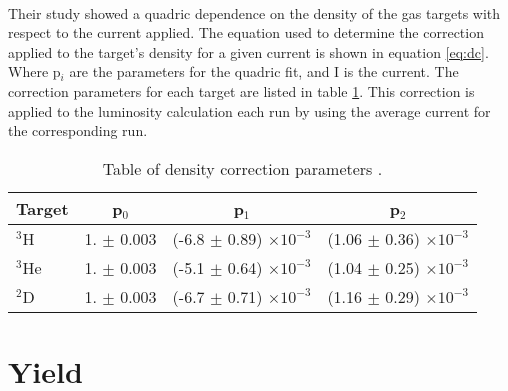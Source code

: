  \paragraph{}Their study showed a quadric dependence on the density of the gas targets with respect to the current applied. The equation used to determine the correction applied to the target's density for a given current is shown in equation \ref{eq:dc}. Where p$_i$ are the parameters for the quadric fit, and I is the current. The correction parameters for each target are listed in table \ref{denct}.  This correction is applied to the luminosity calculation each run by using the average current for the corresponding run. 

\begin{table}[]
	\caption{Table of density correction parameters \cite{denscor}.}
	\label{denct}
	\centering
	\begin{tabular}{lccc}
			\hline
		Target & p$_0$ & p$_1$ & p$_2$  \\
		\hline
		$^3$H & 1. $\pm$ 0.003 & (-6.8 $\pm$ 0.89) $\times 10^{-3}$ & (1.06 $\pm$ 0.36) $\times 10^{-3}$\\
		$^3$He & 1. $\pm$ 0.003 & (-5.1 $\pm$ 0.64) $\times 10^{-3}$ & (1.04 $\pm$ 0.25) $\times 10^{-3}$\\
		$^2$D & 1. $\pm$ 0.003 & (-6.7 $\pm$ 0.71) $\times 10^{-3}$ & (1.16 $\pm$ 0.29) $\times 10^{-3}$\\
		\hline
	\end{tabular}
\end{table}

\section{Yield}\label{sec:Yield}

